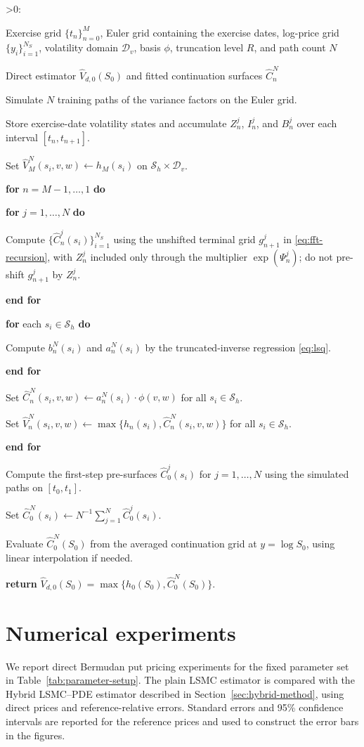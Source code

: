 \documentclass[pdflatex,sn-mathphys-num]{sn-jnl}
\makeatletter
\newcounter{ALG@line}
\newenvironment{algorithmic}[1][0]{%
  \setcounter{ALG@line}{0}%
  \def\ALG@freq{#1}%
  \begin{list}{\ifnum\ALG@freq>0\refstepcounter{ALG@line}\arabic{ALG@line}:\fi}{%
\setlength{\leftmargin}{2.2em}%
\setlength{\labelwidth}{1.8em}%
\setlength{\labelsep}{0.4em}%
\setlength{\itemsep}{2pt}%
\setlength{\parsep}{0pt}%
\setlength{\topsep}{3pt}%
  }%
}{\end{list}}
\newcommand{\Require}{\item[\textbf{Require:}]}
\newcommand{\Ensure}{\item[\textbf{Ensure:}]}
\newcommand{\State}{\item}
\newcommand{\For}[1]{\State \textbf{for} #1 \textbf{do}}
\newcommand{\EndFor}{\State \textbf{end for}}
\theoremstyle{thmstyleone}%
\theoremstyle{thmstylethree}%
\theoremstyle{thmstyletwo}%
\makeatother
\begin{document}
\begin{algorithm}[H]
\caption{Hybrid LSMC--PDE recursion}\label{alg:hybrid-lsmc-pde}
\begin{algorithmic}[1]
\Require Exercise grid $\{t_n\}_{n=0}^M$, Euler grid containing the exercise dates, log-price grid $\{y_i\}_{i=1}^{N_S}$, volatility domain $\mathcal D_v$, basis $\phi$, truncation level $R$, and path count $N$
\Ensure Direct estimator $\widehat V_{d,0}(S_0)$ and fitted continuation surfaces $\widehat C_n^N$
\State Simulate $N$ training paths of the variance factors on the Euler grid.
\State Store exercise-date volatility states and accumulate $Z_n^j$, $I_n^j$, and $B_n^j$ over each interval $[t_n,t_{n+1}]$.
\State Set $\widehat V_M^N(s_i,v,w)\gets h_M(s_i)$ on $\mathcal S_h\times\mathcal D_v$.
\For{$n=M-1,\ldots,1$}
\For{$j=1,\ldots,N$}
\State Compute $\{\widehat C_n^j(s_i)\}_{i=1}^{N_S}$ using the unshifted terminal grid $g_{n+1}^j$ in \eqref{eq:fft-recursion}, with $Z_n^j$ included only through the multiplier $\exp(\Psi_n^j)$; do not pre-shift $g_{n+1}^j$ by $Z_n^j$.
\EndFor
\For{each $s_i\in\mathcal S_h$}
\State Compute $b_n^N(s_i)$ and $a_n^N(s_i)$ by the truncated-inverse regression \eqref{eq:lsq}.
\EndFor
\State Set $\widehat C_n^N(s_i,v,w)\gets a_n^N(s_i)\cdot\phi(v,w)$ for all $s_i\in\mathcal S_h$.
\State Set $\widehat V_n^N(s_i,v,w)\gets\max\{h_n(s_i),\widehat C_n^N(s_i,v,w)\}$ for all $s_i\in\mathcal S_h$.
\EndFor
\State Compute the first-step pre-surfaces $\widehat C_0^j(s_i)$ for $j=1,\ldots,N$ using the simulated paths on $[t_0,t_1]$.
\State Set $\widehat C_0^N(s_i)\gets N^{-1}\sum_{j=1}^{N}\widehat C_0^j(s_i)$.
\State Evaluate $\widehat C_0^N(S_0)$ from the averaged continuation grid at $y=\log S_0$, using linear interpolation if needed.
\State \textbf{return} $\widehat V_{d,0}(S_0)=\max\{h_0(S_0),\widehat C_0^N(S_0)\}$.
\end{algorithmic}
\end{algorithm}
\section{Numerical experiments}\label{sec:numerical}

We report direct Bermudan put pricing experiments for the fixed parameter set in
Table~\ref{tab:parameter-setup}. The plain LSMC estimator
\cite{longstaff2001valuing} is compared with the Hybrid LSMC--PDE estimator
described in Section~\ref{sec:hybrid-method}, using direct prices and
reference-relative errors.
Standard errors and 95\% confidence intervals are reported for the reference
prices and used to construct the error bars in the figures.
\end{document}
